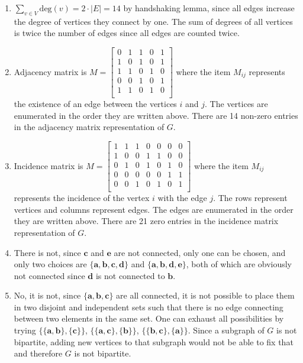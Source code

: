\documentclass[12pt]{article}
\begin{document}
\begin{enumerate}

\item
$\displaystyle\sum_{v \in V} \text{deg}(v) = 2 \cdot |E| = 14$ by handshaking lemma, since all edges increase the degree of vertices they connect by one.
The sum of degrees of all vertices is twice the number of edges since all edges are counted twice.

\item
Adjacency matrix is $M=
\begin{bmatrix}
0 & 1 & 1 & 0 & 1 \\
1 & 0 & 1 & 0 & 1 \\
1 & 1 & 0 & 1 & 0 \\
0 & 0 & 1 & 0 & 1 \\
1 & 1 & 0 & 1 & 0 \\
\end{bmatrix}$
where the item $M_{ij}$ represents the existence of an edge between the vertices $i$ and $j$.
The vertices are enumerated in the order they are written above.
There are 14 non-zero entries in the adjacency matrix representation of $G$.

\item
Incidence matrix is $M=
\begin{bmatrix}
1 & 1 & 1 & 0 & 0 & 0 & 0 \\
1 & 0 & 0 & 1 & 1 & 0 & 0 \\
0 & 1 & 0 & 1 & 0 & 1 & 0 \\
0 & 0 & 0 & 0 & 0 & 1 & 1 \\
0 & 0 & 1 & 0 & 1 & 0 & 1 \\
\end{bmatrix}$
where the item $M_{ij}$ represents the incidence of the vertex $i$ with the edge $j$.
The rows represent vertices and columns represent edges.
The edges are enumerated in the order they are written above.
There are 21 zero entries in the incidence matrix representation of $G$.

\item
There is not, since $\textbf{c}$ and $\textbf{e}$ are not connected, only one can be chosen, and only two choices are $\{\textbf{a}, \textbf{b}, \textbf{c}, \textbf{d}\}$ and $\{\textbf{a}, \textbf{b}, \textbf{d}, \textbf{e}\}$, both of which are obviously not connected since $\textbf{d}$ is not connected to $\textbf{b}$.

\item
No, it is not, since $\{\textbf{a}, \textbf{b}, \textbf{c}\}$ are all connected, it is not possible to place them in two disjoint and independent sets such that there is no edge connecting between two elements in the same set.
One can exhaust all possibilities by trying $\{\{\textbf{a}, \textbf{b}\}, \{\textbf{c}\}\}$, $\{\{\textbf{a}, \textbf{c}\}, \{\textbf{b}\}\}$, $\{\{\textbf{b}, \textbf{c}\}, \{\textbf{a}\}\}$.
Since a subgraph of $G$ is not bipartite, adding new vertices to that subgraph would not be able to fix that and therefore $G$ is not bipartite.


\end{enumerate}
\end{document}
